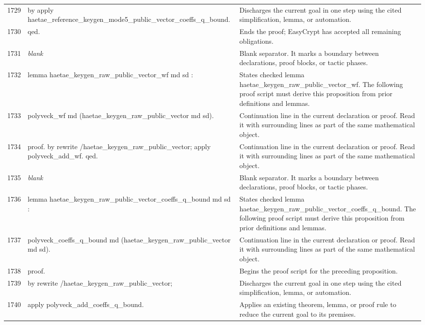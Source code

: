 \documentclass[10pt]{article}
\begin{document}
\begin{longtable}{r L{0.53\textwidth} L{0.37\textwidth}}
1729 & {\ttfamily\scriptsize by apply haetae\_reference\_keygen\_mode5\_public\_vector\_coeffs\_q\_bound.} & Discharges the current goal in one step using the cited simplification, lemma, or automation. \\
1730 & {\ttfamily\scriptsize qed.} & Ends the proof; EasyCrypt has accepted all remaining obligations. \\
1731 & {\ttfamily\scriptsize \emph{blank}} & Blank separator.  It marks a boundary between declarations, proof blocks, or tactic phases. \\
1732 & {\ttfamily\scriptsize lemma haetae\_keygen\_raw\_public\_vector\_wf md sd :} & States checked lemma haetae\_keygen\_raw\_public\_vector\_wf.  The following proof script must derive this proposition from prior definitions and lemmas. \\
1733 & {\ttfamily\scriptsize   polyveck\_wf md (haetae\_keygen\_raw\_public\_vector md sd).} & Continuation line in the current declaration or proof.  Read it with surrounding lines as part of the same mathematical object. \\
1734 & {\ttfamily\scriptsize proof. by rewrite /haetae\_keygen\_raw\_public\_vector; apply polyveck\_add\_wf. qed.} & Continuation line in the current declaration or proof.  Read it with surrounding lines as part of the same mathematical object. \\
1735 & {\ttfamily\scriptsize \emph{blank}} & Blank separator.  It marks a boundary between declarations, proof blocks, or tactic phases. \\
1736 & {\ttfamily\scriptsize lemma haetae\_keygen\_raw\_public\_vector\_coeffs\_q\_bound md sd :} & States checked lemma haetae\_keygen\_raw\_public\_vector\_coeffs\_q\_bound.  The following proof script must derive this proposition from prior definitions and lemmas. \\
1737 & {\ttfamily\scriptsize   polyveck\_coeffs\_q\_bound md (haetae\_keygen\_raw\_public\_vector md sd).} & Continuation line in the current declaration or proof.  Read it with surrounding lines as part of the same mathematical object. \\
1738 & {\ttfamily\scriptsize proof.} & Begins the proof script for the preceding proposition. \\
1739 & {\ttfamily\scriptsize by rewrite /haetae\_keygen\_raw\_public\_vector;} & Discharges the current goal in one step using the cited simplification, lemma, or automation. \\
1740 & {\ttfamily\scriptsize    apply polyveck\_add\_coeffs\_q\_bound.} & Applies an existing theorem, lemma, or proof rule to reduce the current goal to its premises. \\

\end{longtable}
\end{document}
